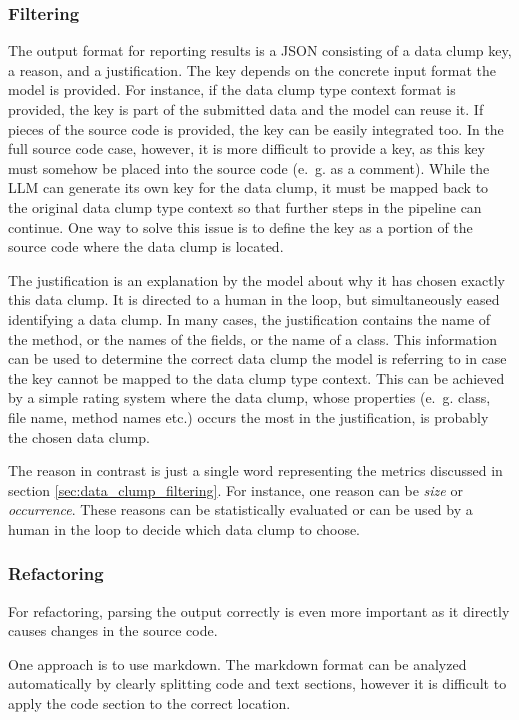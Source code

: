 \subsubsection{Filtering}\label{sec:output_format_filtering}
 The output format for reporting results is a \ac{JSON}  consisting of a data clump key, a reason, and a justification. The key depends on the concrete input format the model is provided. For instance, if the data clump type context format is provided, the key is part of the submitted data and the model can reuse it. If pieces of the source code is provided, the key can be easily integrated too. In the full source code case, however, it is more difficult to provide a key, as this key must somehow be placed into the source code (e.~g. as a comment). While the \ac{LLM} can generate its own key for the data clump, it must be mapped back to the original data clump type context so that further steps in the pipeline can continue. One way to solve this issue is to define the key as a portion of the source code where the data clump is located. 

 The justification is an explanation by the model about why it has chosen exactly this data clump. It is directed to a human in the loop, but simultaneously eased identifying a data clump. In many cases, the justification contains the name of the method, or the names of the fields, or the name of a class. This information can be used to determine the correct data clump the model is referring to in case the key cannot be mapped to the  data clump type context. This can be achieved by a simple rating system where the data clump, whose properties (e.~g. class, file name, method names etc.) occurs the most in the justification, is probably the chosen data clump. 

 The reason in contrast is just a single word representing the metrics discussed in section \ref{sec:data_clump_filtering}. For instance, one reason can be \textit{size} or \textit{occurrence}. These reasons can be statistically evaluated or can be used by a human in the loop to decide which data clump to choose. 

\subsubsection{Refactoring}
For refactoring, parsing the output correctly is even more important as it directly causes changes in the source code.

One approach is to use markdown. The markdown format can be analyzed automatically by clearly splitting code and text sections, however it is difficult to apply the code section to the correct location. 

